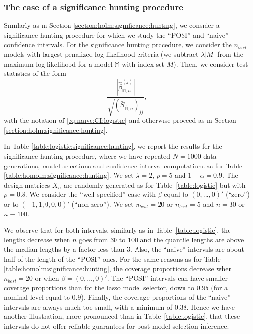 \documentclass[preprint]{imsart}
\newcommand{\M}{\mathbb M}
\numberwithin{equation}{section}
\begin{document}
 
\subsubsection{The case of a significance hunting procedure}

Similarly as in Section \ref{section:holm:significance:hunting}, we consider a significance hunting procedure for which we study the ``POSI'' and ``naive'' confidence intervals. For the significance hunting procedure, we consider the $n_{best}$ models with largest penalized log-likelihood criteria (we subtract $\lambda |M|$ from the maximum log-likelihood for a model $\M$ with index set $M$). Then, we consider test statistics of the form 
\[
\frac{
\left| \hat{\beta}^{(j)}_{\mathbb{M},n} \right|
}{
 \sqrt{ (\bar{S}_{\hat{\M},n})_{jj} }
},
\]
with the notation of \eqref{eq:naive:CI:logistic}
and otherwise proceed as in Section \ref{section:holm:significance:hunting}. 

In Table \ref{table:logistic:significance:hunting}, we report the results for the significance hunting procedure, where we have repeated $N=1000$ data generations, model selections and confidence interval computations as for Table \ref{table:homolm:significance:hunting}. We set $\lambda=2$, $p=5$ and $1-\alpha=0.9$. The design matrices $X_n$ are randomly generated as for Table~\ref{table:logistic} but with $\rho = 0.8$. We consider the ``well-specified'' case with $\beta$ equal to $(0,...,0)'$ (``zero'') or to $(-1,1,0,0,0)'$ (``non-zero''). We set $n_{best} = 20$ or $n_{best} = 5$ and $n=30$ or $n=100$. 

We observe that for both intervals, similarly as in Table~\ref{table:logistic}, the lengths decrease when $n$ goes from $30$ to $100$ and the quantile lengths are above the median lengths by a factor less than $3$. Also, the ``naive'' intervals are about half of the length of the ``POSI'' ones.
For the same reasons as for Table \ref{table:homolm:significance:hunting}, the coverage proportions decrease when $n_{best} = 20$ or when $\beta = (0,...,0)'$. The ``POSI'' intervals can have smaller coverage proportions than for the lasso model selector, down to $0.95$ (for a nominal level equal to $0.9$). 
Finally, the coverage proportions of the ``naive'' intervals are always much too small, with a minimum of $0.38$. Hence we have another illustration, more pronounced than in Table~\ref{table:logistic}, that these intervals do not offer reliable guarantees for post-model selection inference.
\end{document}
